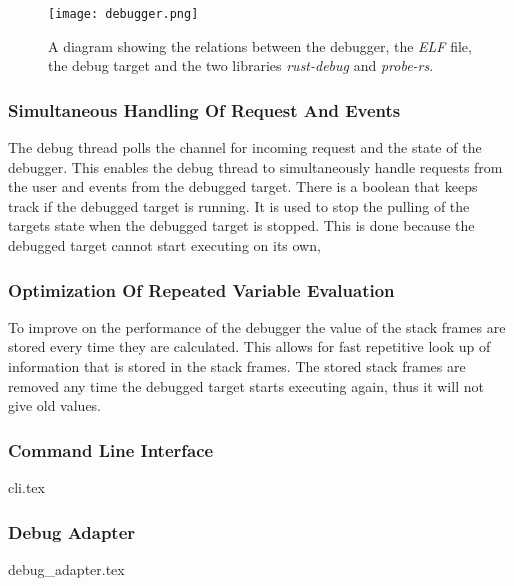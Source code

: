 \begin{figure}[h]
	\centering
	\texttt{[image: debugger.png]}
	\caption{A diagram showing the relations between the debugger, the \emph{ELF} file, the debug target and the two libraries \emph{rust-debug} and \emph{probe-rs}.}
	\label{fig:debugger}
\end{figure}


\subsubsection{Simultaneous Handling Of Request And Events}
The debug thread polls the channel for incoming request and the state of the debugger.
This enables the debug thread to simultaneously handle requests from the user and events from the debugged target.
There is a boolean that keeps track if the debugged target is running.
It is used to stop the pulling of the targets state when the debugged target is stopped.
This is done because the debugged target cannot start executing on its own,


\subsubsection{Optimization Of Repeated Variable Evaluation}
To improve on the performance of the debugger the value of the stack frames are stored every time they are calculated.
This allows for fast repetitive look up of information that is stored in the stack frames.
The stored stack frames are removed any time the debugged target starts executing again, thus it will not give old values.




\subsubsection{Command Line Interface}
{cli.tex}


\subsubsection{Debug Adapter}
{debug_adapter.tex}


